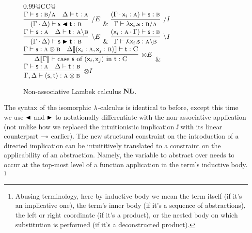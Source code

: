 \begin{figure}
	\centering
	\begin{tabularx}{0.99\textwidth}{@{}CC@{}}
		\\[2em]
		$\infer[\divright E]{(\Gamma \sbind \Delta) \vdash \term{s}\nappright\term{t}: \prop{b}}{\Gamma \vdash \term{s}: \prop{b} \divright \prop{a} & \Delta \vdash \term{t}: \prop{a}}$
		& 
		$\infer[\divright I]{\Gamma \vdash \term{\lam \vari .s}: \prop{b} \divright \prop{a}}{(\Gamma \sbind \term{\vari }: \prop{a}) \vdash \term{s}:\prop{b}}$\\[2em]
		$\infer[\divleft E]{(\Gamma \sbind \Delta) \vdash \term{s}\nappleft\term{t}:\prop{b}}{\Gamma \vdash \term{s}: \prop{a} & \Delta \vdash \term{t}: \prop{a}\divleft\prop{b}}$
		& 
		$\infer[\divleft I]{\Gamma \vdash \term{\adbmal \vari .s}: \prop{a} \divleft \prop{b}}{(\term{\vari }: \prop{a} \sbind \Gamma) \vdash  \term{s}:\prop{b}}$\\[2em]
		$\infer[\otimes E]{\Delta\ctx{\Gamma} \vdash \cterm{case \term{s} of \term{(\vari , \varj)} in \term{t}}: \prop C}{
			\Gamma \vdash \term{s}: \prop{a}\otimes\prop{b}
			&
			\Delta\ctx{(\term{\vari }: \prop{a}, \term{\varj}: \prop{b})}  \vdash \term{t}: \prop C}$
		&
		$\infer[\otimes I]{\Gamma,\Delta \vdash \term{(s,t)}: \prop{a} \otimes \prop{b}}{\Gamma \vdash \term{s}: \prop{a} & \Delta \vdash \term{t}: \prop{b}}$
	\end{tabularx}
	\caption{Non-associative Lambek calculus $\textbf{NL}$.}
	\label{figure:non_assoc_lambek_rules}
\end{figure}

The syntax of the isomorphic $\mathnormal{\lambda}$-calculus is identical to before, except this time we use $\blacktriangleleft$ and $\blacktriangleright$ to notationally differentiate with the non-associative application (not unlike how we replaced the intuitionistic implication $\ii$ with its linear counterpart $\li$ earlier).
The new structural constraint on the introduction of a directed implication can be intuititively translated to a constraint on the applicability of an abstraction.
Namely, the variable to abstract over needs to occur at the top-most level of a function application in the term's inductive body.%
\footnote{Abusing terminology, here by inductive body we mean the term itself (if it's an implicative one), the term's inner body (if it's a sequence of abstractions), the left or right coordinate (if it's a product), or the nested body on which substitution is performed (if it's a deconstructed product).}

